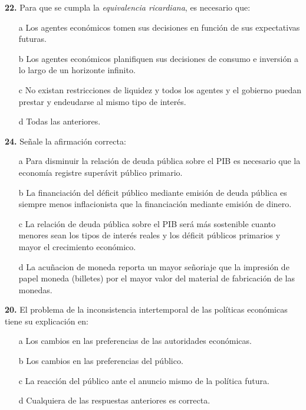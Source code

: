\documentclass{nuevotema}
\begin{document}
\bigskip

\textbf{22.} Para que se cumpla la \textit{equivalencia ricardiana}, es necesario que:

\begin{itemize}
	\item[a] Los agentes económicos tomen sus decisiones en función de sus expectativas futuras.
	\item[b] Los agentes económicos planifiquen sus decisiones de consumo e inversión a lo largo de un horizonte infinito.
	\item[c] No existan restricciones de liquidez y todos los agentes y el gobierno puedan prestar y endeudarse al mismo tipo de interés.
	\item[d] Todas las anteriores.
\end{itemize}


\textbf{24.} Señale la afirmación correcta:
\begin{itemize}
	\item[a] Para disminuir la relación de deuda pública sobre el PIB es necesario que la economía registre superávit público primario.
	\item[b] La financiación del déficit público mediante emisión de deuda pública es siempre menos inflacionista que la financiación mediante emisión de dinero.
	\item[c] La relación de deuda pública sobre el PIB será más sostenible cuanto menores sean los tipos de interés reales y los déficit públicos primarios y mayor el crecimiento económico.
	\item[d] La acuñacion de moneda reporta un mayor señoriaje que la impresión de papel moneda (billetes) por el mayor valor del material de fabricación de las monedas.
\end{itemize}

\textbf{20.} El problema de la inconsistencia intertemporal de las políticas económicas tiene su explicación en:

\begin{itemize}
	\item[a] Los cambios en las preferencias de las autoridades económicas.
	\item[b] Los cambios en las preferencias del público.
	\item[c] La reacción del público ante el anuncio mismo de la política futura.
	\item[d] Cualquiera de las respuestas anteriores es correcta.
\end{itemize}
\end{document}
